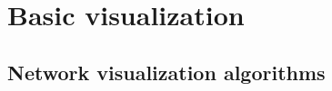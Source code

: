 \documentclass[xcolor=dvipsnames, 9pt]{beamer}
\begin{document}


\section{Basic visualization} %
\label{sec:basic_visualization}

\subsection{Network visualization algorithms} %
\label{sub:network_visualization_algorithms}


\end{document}
